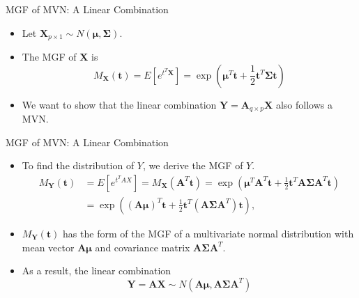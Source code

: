\documentclass[
  ignorenonframetext,
]{beamer}
\begin{document}
\begin{frame}{MGF of MVN: A Linear Combination}
\protect\hypertarget{mgf-of-mvn-a-linear-combination}{}
\begin{itemize}
\item
  Let
  \(\mathbf{X}_{p\times 1}\sim N(\boldsymbol \mu, \boldsymbol \Sigma)\).
\item
  The MGF of \(\mathbf X\) is \[
  M_{\mathbf{X}}(\mathbf{t}) = E[e^{t^T\mathbf X}]=\exp\left(\boldsymbol{\mu}^T \mathbf{t} + \frac{1}{2} \mathbf{t}^T \boldsymbol{\Sigma} \mathbf{t}\right)
  \]
\item
  We want to show that the linear combination
  \(\mathbf{Y} = \mathbf{A}_{q\times p}\mathbf{X}\) also follows a MVN.
\end{itemize}
\end{frame}

\begin{frame}{MGF of MVN: A Linear Combination}
\protect\hypertarget{mgf-of-mvn-a-linear-combination-1}{}
\begin{itemize}
\item
  To find the distribution of \(Y\), we derive the MGF of \(Y\). \[
  \begin{aligned}
  M_{\mathbf{Y}}(\mathbf{t}) &= E[e^{t^TAX}]=M_{\mathbf{X}}(\mathbf{A}^T \mathbf{t}) = \exp\left(\boldsymbol{\mu}^T \mathbf{A}^T \mathbf{t} + \frac{1}{2} \mathbf{t}^T \mathbf{A} \boldsymbol{\Sigma} \mathbf{A}^T \mathbf{t}\right)\\
  &=\exp\left((\mathbf{A}\boldsymbol{\mu})^T \mathbf{t} + \frac{1}{2} \mathbf{t}^T (\mathbf{A}\boldsymbol{\Sigma}\mathbf{A}^T) \mathbf{t}\right),
  \end{aligned}
  \]
\item
  \(M_{\mathbf{Y}}(\mathbf{t})\) has the form of the MGF of a
  multivariate normal distribution with mean vector
  \(\mathbf{A}\boldsymbol{\mu}\) and covariance matrix
  \(\mathbf{A}\boldsymbol{\Sigma}\mathbf{A}^T\).
\item
  As a result, the linear combination
  \[\mathbf Y =\mathbf A \mathbf X \sim N(\mathbf A \boldsymbol \mu, \boldsymbol A \boldsymbol \Sigma \mathbf A^T)\]
\end{itemize}
\end{frame}
\end{document}
